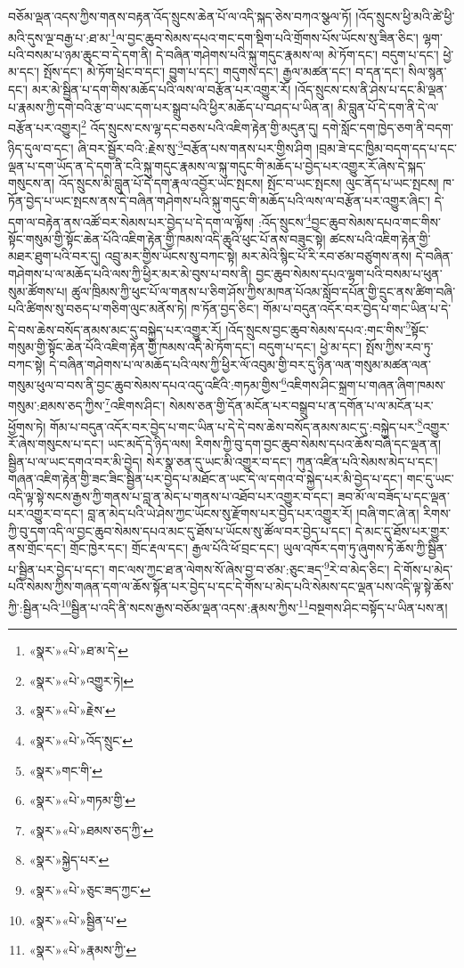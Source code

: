 བཅོམ་ལྡན་འདས་ཀྱིས་གནས་བརྟན་འོད་སྲུངས་ཆེན་པོ་ལ་འདི་སྐད་ཅེས་བཀའ་སྩལ་ཏོ། །འོད་སྲུངས་ཕྱི་མའི་ཚེ་ཕྱི་མའི་དུས་ལྔ་བརྒྱ་པ་:ཐ་མ་\footnote{«སྣར་»«པེ་»ཐ་མ་དེ་}ལ་བྱང་ཆུབ་སེམས་དཔའ་གང་དག་སྡིག་པའི་གྲོགས་པོས་ཡོངས་སུ་ཟིན་ཅིང་། ལྷག་པའི་བསམ་པ་ཉམ་ཆུང་བ་དེ་དག་ནི། དེ་བཞིན་གཤེགས་པའི་སྐུ་གདུང་རྣམས་ལ། མེ་ཏོག་དང་། བདུག་པ་དང་། ཕྱེ་མ་དང་། སྤོས་དང་། མེ་ཏོག་ཕྲེང་བ་དང་། བྱུག་པ་དང་། གདུགས་དང་། རྒྱལ་མཚན་དང་། བ་དན་དང་། སིལ་སྙན་དང་། མར་མེ་སྦྱིན་པ་དག་གིས་མཆོད་པའི་ལས་ལ་བརྩོན་པར་འགྱུར་རོ། །འོད་སྲུངས་ངས་ནི་ཤེས་པ་དང་མི་ལྡན་པ་རྣམས་ཀྱི་དགེ་བའི་རྩ་བ་ཡང་དག་པར་སྒྲུབ་པའི་ཕྱིར་མཆོད་པ་བཤད་པ་ཡིན་ན། མི་བླུན་པོ་དེ་དག་ནི་དེ་ལ་བརྩོན་པར་འགྱུར།\footnote{«སྣར་»«པེ་»འགྱུར་ཏེ།} འོད་སྲུངས་ངས་ལྷ་དང་བཅས་པའི་འཇིག་རྟེན་གྱི་མདུན་དུ། དགེ་སློང་དག་ཁྱེད་ཅག་ནི་བདག་ཉིད་དུལ་བ་དང་། ཞི་བར་སྦྱོར་བའི་:རྗེས་སུ་\footnote{«སྣར་»«པེ་»རྗེས་}བརྩོན་པས་གནས་པར་གྱིས་ཤིག །བྲམ་ཟེ་དང་ཁྱིམ་བདག་དད་པ་དང་ལྡན་པ་དག་ཡོད་ན་དེ་དག་ནི་ངའི་སྐུ་གདུང་རྣམས་ལ་སྐུ་གདུང་གི་མཆོད་པ་བྱེད་པར་འགྱུར་རོ་ཞེས་དེ་སྐད་གསུངས་ན། འོད་སྲུངས་མི་བླུན་པོ་དེ་དག་རྣལ་འབྱོར་ཡང་སྤངས། སྤོང་བ་ཡང་སྤངས། ལུང་ནོད་པ་ཡང་སྤངས། ཁ་ཏོན་བྱེད་པ་ཡང་སྤངས་ནས་དེ་བཞིན་གཤེགས་པའི་སྐུ་གདུང་གི་མཆོད་པའི་ལས་ལ་བརྩོན་པར་འགྱུར་ཞིང་། དེ་དག་ལ་བརྟེན་ནས་འཚོ་བར་སེམས་པར་བྱེད་པ་དེ་དག་ལ་ལྟོས། :འོད་སྲུངས་\footnote{«སྣར་»«པེ་»འོད་སྲུང་}བྱང་ཆུབ་སེམས་དཔའ་གང་གིས་སྟོང་གསུམ་གྱི་སྟོང་ཆེན་པོའི་འཇིག་རྟེན་གྱི་ཁམས་འདི་ཆུའི་ཕུང་པོ་ནས་བཟུང་སྟེ། ཚངས་པའི་འཇིག་རྟེན་གྱི་མཐར་ཐུག་པའི་བར་དུ། འབྲུ་མར་གྱིས་ཡོངས་སུ་བཀང་སྟེ། མར་མེའི་སྙིང་པོ་རི་རབ་ཙམ་བཙུགས་ནས། དེ་བཞིན་གཤེགས་པ་ལ་མཆོད་པའི་ལས་ཀྱི་ཕྱིར་མར་མེ་བུས་པ་བས་ནི། བྱང་ཆུབ་སེམས་དཔའ་ལྷག་པའི་བསམ་པ་ཕུན་སུམ་ཚོགས་པ། ཚུལ་ཁྲིམས་ཀྱི་ཕུང་པོ་ལ་གནས་པ་ཅིག་ཤོས་ཀྱིས་མཁན་པོའམ་སློབ་དཔོན་གྱི་དྲུང་ནས་ཚིག་བཞི་པའི་ཚིགས་སུ་བཅད་པ་གཅིག་ལུང་མནོས་ཏེ། ཁ་ཏོན་བྱད་ཅིང་། གོམ་པ་བདུན་འདོར་བར་བྱེད་པ་གང་ཡིན་པ་དེ་དེ་བས་ཆེས་བསོད་ནམས་མང་དུ་བསྐྱེད་པར་འགྱུར་རོ། །འོད་སྲུངས་བྱང་ཆུབ་སེམས་དཔའ་:གང་གིས་\footnote{«སྣར་»གང་གི་}སྟོང་གསུམ་གྱི་སྟོང་ཆེན་པོའི་འཇིག་རྟེན་གྱི་ཁམས་འདི་མེ་ཏོག་དང་། བདུག་པ་དང་། ཕྱེ་མ་དང་། སྤོས་ཀྱིས་རབ་ཏུ་བཀང་སྟེ། དེ་བཞིན་གཤེགས་པ་ལ་མཆོད་པའི་ལས་ཀྱི་ཕྱིར་ལོ་འབུམ་གྱི་བར་དུ་ཉིན་ལན་གསུམ་མཚན་ལན་གསུམ་ཕུལ་བ་བས་ནི་བྱང་ཆུབ་སེམས་དཔའ་འདུ་འཛིའི་:གཏམ་གྱིས་\footnote{«སྣར་»«པེ་»གཏམ་གྱི་}འཇིགས་ཤིང་སྐྲག་པ་གཞན་ཞིག་ཁམས་གསུམ་:ཐམས་ཅད་ཀྱིས་\footnote{«སྣར་»«པེ་»ཐམས་ཅད་ཀྱི་}འཇིགས་ཤིང་། སེམས་ཅན་གྱི་དོན་མངོན་པར་བསྒྲུབ་པ་ན་དགོན་པ་ལ་མངོན་པར་ཕྱོགས་ཏེ། གོམ་པ་བདུན་འདོར་བར་བྱེད་པ་གང་ཡིན་པ་དེ་དེ་བས་ཆེས་བསོད་ནམས་མང་དུ་:བསྐྱེད་པར་\footnote{«སྣར་»སྐྱེད་པར་}འགྱུར་རོ་ཞེས་གསུངས་པ་དང་། ཡང་མདོ་དེ་ཉིད་ལས། རིགས་ཀྱི་བུ་དག་བྱང་ཆུབ་སེམས་དཔའ་ཆོས་བཞི་དང་ལྡན་ན། སྦྱིན་པ་ལ་ཡང་དགའ་བར་མི་བྱེད། སེར་སྣ་ཅན་དུ་ཡང་མི་འགྱུར་བ་དང་། ཀུན་འཛིན་པའི་སེམས་མེད་པ་དང་། གཞན་འཇིག་རྟེན་གྱི་ཟང་ཟིང་སྦྱིན་པར་བྱེད་པ་མཐོང་ན་ཡང་དེ་ལ་དགའ་བ་སྐྱེད་པར་མི་བྱེད་པ་དང་། གང་དུ་ཡང་འདི་ལྟ་སྟེ་སངས་རྒྱས་ཀྱི་གནས་པ་བླ་ན་མེད་པ་གནས་པ་འཐོབ་པར་འགྱུར་བ་དང་། ཟབ་མོ་ལ་བཟོད་པ་དང་ལྡན་པར་འགྱུར་བ་དང་། བླ་ན་མེད་པའི་ཡེ་ཤེས་ཀྱང་ཡོངས་སུ་རྫོགས་པར་བྱེད་པར་འགྱུར་རོ། །བཞི་གང་ཞེ་ན། རིགས་ཀྱི་བུ་དག་འདི་ལ་བྱང་ཆུབ་སེམས་དཔའ་མང་དུ་ཐོས་པ་ཡོངས་སུ་ཚོལ་བར་བྱེད་པ་དང་། དེ་མང་དུ་ཐོས་པར་གྱུར་ནས་གྲོང་དང་། གྲོང་ཁྱེར་དང་། གྲོང་རྡལ་དང་། རྒྱལ་པོའི་ཕོ་བྲང་དང་། ཡུལ་འཁོར་དག་ཏུ་ཞུགས་ཏེ་ཆོས་ཀྱི་སྦྱིན་པ་སྦྱིན་པར་བྱེད་པ་དང་། གང་ལས་ཀྱང་ཐ་ན་ལེགས་སོ་ཞེས་བྱ་བ་ཙམ་:ཅུང་ཟད་\footnote{«སྣར་»«པེ་»ཅུང་ཟད་ཀྱང་}རེ་བ་མེད་ཅིང་། དེ་གོས་པ་མེད་པའི་སེམས་ཀྱིས་གཞན་དག་ལ་ཆོས་སྟོན་པར་བྱེད་པ་དང་དེ་གོས་པ་མེད་པའི་སེམས་དང་ལྡན་པས་འདི་ལྟ་སྟེ་ཆོས་ཀྱི་:སྦྱིན་པའི་\footnote{«སྣར་»«པེ་»སྦྱིན་པ་}སྦྱིན་པ་འདི་ནི་སངས་རྒྱས་བཅོམ་ལྡན་འདས་:རྣམས་ཀྱིས་\footnote{«སྣར་»«པེ་»རྣམས་ཀྱི་}བསྔགས་ཤིང་བསྟོད་པ་ཡིན་པས་ན། 